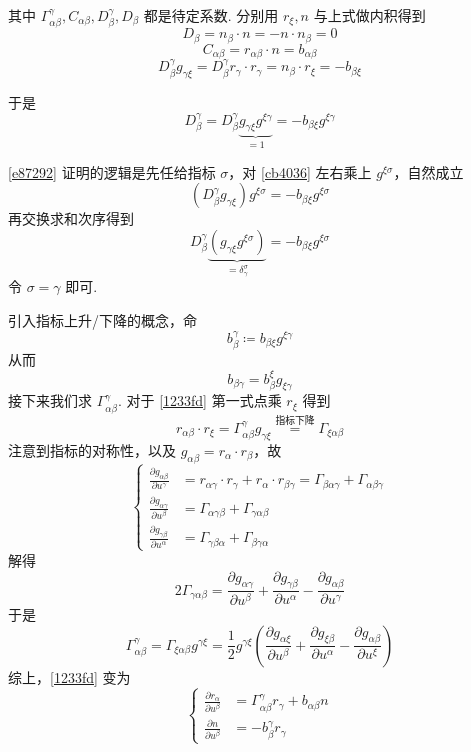 \documentclass{amsart}
\theoremstyle{plain}
\theoremstyle{definition}
\theoremstyle{remark}
\begin{document}
其中 $\Gamma^{\gamma}_{\alpha\beta},C_{\alpha\beta},D^{\gamma}_{\beta},D_{\beta}$ 都是待定系数. 分别用 $r_{\xi},n$ 与上式做内积得到
\[
D_{\beta}=n_{\beta}\cdot n=-n\cdot n_{\beta}=0
\]
\[
C_{\alpha\beta}=r_{\alpha\beta}\cdot n=b_{\alpha\beta}
\]
\begin{equation}
D^{\gamma}_{\beta}g_{\gamma \xi}=D^{\gamma}_{\beta}r_{\gamma}\cdot r_{\gamma}=n_{\beta}\cdot r_{\xi}=-b_{\beta \xi}
\label{cb4036}
\end{equation}

于是
\begin{equation}
D^{\gamma}_{\beta}=D^{\gamma}_{\beta}\underbrace{ g_{\gamma \xi}g^{\xi\gamma} }_{ =1 }=-b_{\beta \xi}g^{\xi\gamma}
\label{e87292}
\end{equation}

\cref{e87292} 证明的逻辑是先任给指标 $\sigma$，对 \cref{cb4036} 左右乘上 $g^{\xi\sigma}$，自然成立
\[
(D^{\gamma}_{\beta}g_{\gamma \xi})g^{\xi\sigma}=-b_{\beta \xi}g^{\xi\sigma}
\]
再交换求和次序得到
\[
D^{\gamma}_{\beta}\underbrace{ (g_{\gamma \xi}g^{\xi\sigma}) }_{ =\delta_{\gamma}^{\sigma} }=-b_{\beta \xi}g^{\xi\sigma}
\]
令 $\sigma=\gamma$ 即可.

引入指标上升/下降的概念，命
\[
b^{\gamma}_{\beta}\coloneqq b_{\beta \xi}g^{\xi\gamma}
\]
从而
\[
b_{\beta\gamma}=b_{\beta}^{\xi}g_{\xi\gamma}
\]
接下来我们求 $\Gamma^{\gamma}_{\alpha\beta}$. 对于 \cref{1233fd} 第一式点乘 $r_{\xi}$ 得到
\[
r_{\alpha\beta}\cdot r_{\xi}=\Gamma^{\gamma}_{\alpha \beta}g_{\gamma \xi} \overset{ \text{指标下降} }{ = } \Gamma_{\xi\alpha\beta}
\]
注意到指标的对称性，以及 $g_{\alpha\beta}=r_{\alpha}\cdot r_{\beta}$，故
\[
\begin{cases}
\frac{ \partial g_{\alpha\beta} }{ \partial u^{\gamma} } & =r_{\alpha\gamma}\cdot r_{\gamma}+r_{\alpha}\cdot r_{\beta\gamma}=\Gamma_{\beta\alpha\gamma}+\Gamma_{\alpha\beta\gamma} \\
 \frac{ \partial g _{\alpha\gamma}}{ \partial u^{\beta} }  & =\Gamma_{\alpha\gamma\beta}+\Gamma_{\gamma\alpha\beta} \\
 \frac{ \partial g_{\gamma\beta} }{ \partial u^{\alpha} }  & =\Gamma_{\gamma\beta\alpha}+\Gamma_{\beta\gamma\alpha}
\end{cases}
\]
解得
\[
2\Gamma_{\gamma\alpha\beta}=\frac{ \partial g_{\alpha\gamma} }{ \partial u^{\beta} } +\frac{ \partial g_{\gamma\beta} }{ \partial u^{\alpha} } -\frac{ \partial g_{\alpha\beta} }{ \partial u^{\gamma} } 
\]
于是
\[
\Gamma^{\gamma}_{\alpha\beta}=\Gamma _{\xi\alpha\beta}g^{\gamma \xi}=\frac{1}{2}g^{\gamma \xi}\left( \frac{ \partial g_{\alpha \xi} }{ \partial u^{\beta} } +\frac{ \partial g_{\xi\beta} }{ \partial u^{\alpha} } -\frac{ \partial g_{\alpha\beta} }{ \partial u^{\xi} }  \right)
\]
综上，\cref{1233fd} 变为
\begin{equation}
\begin{cases}
\frac{ \partial r_{\alpha} }{ \partial u^{\beta} }  & =\Gamma^{\gamma}_{\alpha\beta}r_{\gamma}+b_{\alpha\beta}n \\
\frac{ \partial n }{ \partial u^{\beta} }  & =-b^{\gamma}_{\beta}r_{\gamma }
\end{cases}
\label{9c4151}
\end{equation}
\end{document}
